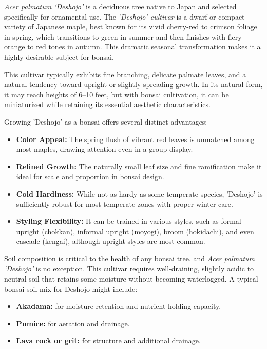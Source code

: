 \medskip
{}
\noindent
\textit{Acer palmatum ‘Deshojo’} is a deciduous tree native to Japan and selected specifically for ornamental use. The \textit{'Deshojo' cultivar} is a dwarf or compact variety of Japanese maple, best known for its vivid cherry\--red to crimson foliage in spring, which transitions to green in summer and then finishes with fiery orange to red tones in autumn. This dramatic seasonal transformation makes it a highly desirable subject for bonsai.

This cultivar typically exhibits fine branching, delicate palmate leaves, and a natural tendency toward upright or slightly spreading growth. In its natural form, it may reach heights of 6--10 feet, but with bonsai cultivation, it can be miniaturized while retaining its essential aesthetic characteristics.

\medskip
{}
\noindent
Growing 'Deshojo' as a bonsai offers several distinct advantages:

\begin{itemize}
    \item \textbf{Color Appeal:} The spring flush of vibrant red leaves is unmatched among most maples, drawing attention even in a group display.
    \item \textbf{Refined Growth:} The naturally small leaf size and fine ramification make it ideal for scale and proportion in bonsai design.
    \item \textbf{Cold Hardiness:} While not as hardy as some temperate species, 'Deshojo' is sufficiently robust for most temperate zones with proper winter care.
    \item \textbf{Styling Flexibility:} It can be trained in various styles, such as formal upright (chokkan), informal upright (moyogi), broom (hokidachi), and even cascade (kengai), although upright styles are most common.
\end{itemize}

\medskip
{}
\noindent
Soil composition is critical to the health of any bonsai tree, and \textit{Acer palmatum ‘Deshojo’} is no exception. This cultivar requires well\--draining, slightly acidic to neutral soil that retains some moisture without becoming waterlogged. A typical bonsai soil mix for Deshojo might include:

\begin{itemize}
    \item \textbf{Akadama:} for moisture retention and nutrient holding capacity.
    \item \textbf{Pumice:} for aeration and drainage.
    \item \textbf{Lava rock or grit:} for structure and additional drainage.
\end{itemize}

